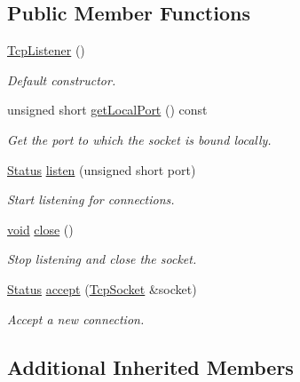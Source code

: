 \subsection*{Public Member Functions}
\begin{DoxyCompactItemize}
\item 
\hyperlink{classsf_1_1_tcp_listener_a59a1db5b6f4711a3e57390da2f8d9630}{Tcp\-Listener} ()
\begin{DoxyCompactList}\small\item\em Default constructor. \end{DoxyCompactList}\item 
unsigned short \hyperlink{classsf_1_1_tcp_listener_a3bb62b92684cd1a14b14efdaf0471440}{get\-Local\-Port} () const 
\begin{DoxyCompactList}\small\item\em Get the port to which the socket is bound locally. \end{DoxyCompactList}\item 
\hyperlink{classsf_1_1_socket_a51bf0fd51057b98a10fbb866246176dc}{Status} \hyperlink{classsf_1_1_tcp_listener_a409d9350d3abfea9636df8cf4a61004e}{listen} (unsigned short port)
\begin{DoxyCompactList}\small\item\em Start listening for connections. \end{DoxyCompactList}\item 
\hyperlink{glutf90_8h_ac778d6f63f1aaf8ebda0ce6ac821b56e}{void} \hyperlink{classsf_1_1_tcp_listener_a3a00a850506bd0f9f48867a0fe59556b}{close} ()
\begin{DoxyCompactList}\small\item\em Stop listening and close the socket. \end{DoxyCompactList}\item 
\hyperlink{classsf_1_1_socket_a51bf0fd51057b98a10fbb866246176dc}{Status} \hyperlink{classsf_1_1_tcp_listener_ae2c83ce5a64d50b68180c46bef0a7346}{accept} (\hyperlink{classsf_1_1_tcp_socket}{Tcp\-Socket} \&socket)
\begin{DoxyCompactList}\small\item\em Accept a new connection. \end{DoxyCompactList}\end{DoxyCompactItemize}
\subsection*{Additional Inherited Members}


